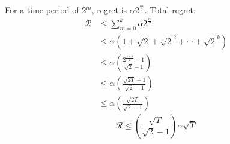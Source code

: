 \documentclass{article}
\begin{document}
For a time period of $2^m$, regret is $\alpha 2^{\frac{m}{2}}$. Total regret:
\begin{align*}
    \mathcal{R} &\leq \sum_{m=0}^{k} \alpha 2^{\frac{m}{2}}\\
                &\leq \alpha \left(1 + \sqrt{2} + \sqrt{2}^2 + \cdots + \sqrt{2}^k \right) \\
                &\leq \alpha \left( \frac{2^{\frac{k+1}{2}} - 1}{\sqrt{2}-1}\right)\\
                &\leq \alpha \left( \frac{\sqrt{2T} - 1}{\sqrt{2}-1}\right)\\
                &\leq \alpha \left( \frac{\sqrt{2T}}{\sqrt{2}-1}\right)
\end{align*}
\[
    \boxed{\mathcal{R} \leq \left(\frac{\sqrt{T}}{\sqrt{2}-1}\right) \alpha \sqrt{T}}
\]



\end{document}
